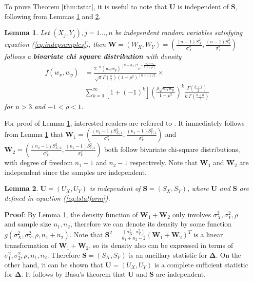 \documentclass[12pt, a4paper]{article}
\newtheorem{lemma}{Lemma}
\begin{document}
	To prove Theorem \ref{thm:tstat}, it is useful to note that $\bm U$ is independent of $\bm S$,
	following from Lemmas \ref{lemmabiChisq} and \ref{lemmaIndep}.
	\begin{lemma}\label{lemmabiChisq}
		Let $(X_{j}, Y_{j}), j=1 \ldots,  n$ be independent random variables satisfying equation (\ref{eq:indepsamples}),
		then $\bm W = (W_{X},W_{Y}) =(\frac{(n -1)S_{X}^2}{\sigma_X^2}, \frac{(n-1)S_{Y}^2}{\sigma_Y^2})$ 
		follows a \textbf{bivariate chi square distribution} with density 
		\begin{equation}\label{biChisq}
			\begin{aligned}
				f(w_x, w_y) & = \frac{2^{-n}(w_xw_y)^{(n-3)/2}e^{-\frac{w_x +
							w_y}{2(1-\rho^2)}}}{\sqrt{\pi}\Gamma(\frac{n}{2})(1-\rho^2)^{(n-1)/2}} \times \\
				& \sum_{k=0}^{\infty}[1 +
				(-1)^k]\left(\frac{\rho\sqrt{w_xw_y}}{1-\rho^2}\right)^k\frac{\Gamma(\frac{k+1}{2})}{k!\Gamma(\frac{k
						+ n}{2})}
			\end{aligned}
		\end{equation}
		for $n>3$ and $-1<\rho < 1$.
	\end{lemma}
	For proof of Lemma \ref{lemmabiChisq}, interested readers are referred to \cite{joarder2009moments}.
	It immediately follows from Lemma \ref{lemmabiChisq} that $\bm W_1 = (\frac{(n_1 -1)S_{X, 1}^2}{\sigma_X^2}, \frac{(n_1-1)S_{Y, 1}^2}{\sigma_Y^2})$ and $\bm W_2 =(\frac{(n_2 -1)S_{X, 2}^2}{\sigma_X^2}, \frac{(n_2-1)S_{Y, 2}^2}{\sigma_Y^2})$ both follow bivariate chi-square distributions, with degree of freedom $n_1-1$ and $n_2-1$ respectively. Note that $\bm W_1$ and $\bm W_2$ are independent since the samples are independent. 
	
	\begin{lemma}\label{lemmaIndep}
		$\bm U =(U_X, U_Y)$ is independent of $\bm S = (S_X ,S_Y)$, where $\bm U$ and $\bm S$ are defined in
		equation (\ref{eq:tstatform}).
	\end{lemma}
	\textbf{Proof}: By Lemma \ref{lemmabiChisq}, the density function of $
	\bm W_1 + \bm W_2$ only involves $\sigma^2_X, \sigma^2_Y, \rho$ and sample size $n_1, n_2$, therefore
	we can denote its density by some function $g(\sigma^2_X, \sigma^2_Y, \rho,
	n_1 + n_2)$. Note that $\bm S^2 = \frac{(\sigma_X^2, ~\sigma^2_Y)}{n_1 +n_2 -2}(\bm W_1 + \bm W_2)^T $
	is a linear transformation of $\bm W_1 + \bm W_2$, so its density also can be expressed in terms of $\sigma^2_1, \sigma^2_2, \rho, n_1, n_2$. Therefore $\bm S = (S_X ,S_Y)$ is an ancillary statistic for $\bm \Delta$. On the other hand, it can
	be shown that $\bm U =(U_X, U_Y)$ is a complete sufficient statistic for $\bm \Delta$. It follows by
	Basu's theorem that $\bm U$ and $\bm S$ are independent. 
	
\end{document}

